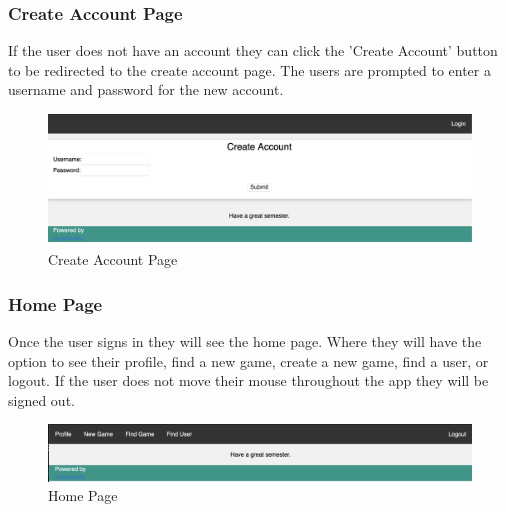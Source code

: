 \documentclass[12pt]{article}
\begin{document}
\subsubsection{Create Account Page}
If the user does not have an account they can click the 'Create Account' button to be redirected to the 
create account page. The users are prompted to enter a username and password for the new account.
\begin{figure}[h!]
    \includegraphics[width=\linewidth]{CREATE_ACCOUNT.png}
    \caption{Create Account Page}
\end{figure}
\newpage
\subsubsection{Home Page}
Once the user signs in they will see the home page. Where they will have the option to see their profile, find a new game, create a new game, find a user, or logout. If the user does not move their mouse throughout the app they will be signed out.
\begin{figure}[h!]
    \includegraphics[width=\linewidth]{HOME_PAGE_ONCE_LOGGED_IN.png}
    \caption{Home Page}
\end{figure}
\end{document}
